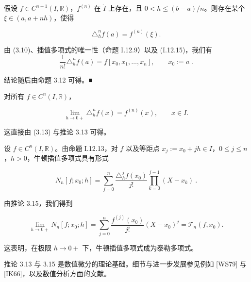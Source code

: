 \begin{proposition}

假设 $ f \in C^{n-1}(I, \mathbb{R}) $，$ f^{(n)} $ 在 $ \mathring{I} $ 上存在，且 $ 0 < h \leq (b - a)/n $。则存在某个 $ \xi \in (a, a + nh) $，使得

\begin{equation}
\triangle_{h}^{n}f(a)=f^{(n)}(\xi).
\end{equation}

\proofhead
由 (3.10)、插值多项式的唯一性（命题 I.12.9）以及 (I.12.15)，我们有
\begin{equation}
\frac{1}{n!}\triangle_{h}^{n}f(a)=f[x_{0},x_{1},\ldots,x_{n}],\qquad x_{0}:=a\;.
\end{equation}

结论随后由命题 3.12 可得。■

\end{proposition}

\begin{corollary}

对所有 $ f \in C^n(I, \mathbb{R}) $，

\[
\lim_{h\to0+}\triangle_{h}^{n} f(x)=f^{(n)}(x),\qquad x\in I.
\]

\proofhead
这直接由 (3.13) 与推论 3.13 可得。
\end{corollary}

\begin{remark}

\begin{items}
\item

设 $ f \in C^n(I, \mathbb{R}) $。由命题 I.12.13，对 $ f $ 以及等距点 $ x_j := x_0 + jh \in I $，$ 0 \leq j \leq n $，$ h > 0 $，牛顿插值多项式具有形式

\[
N_{n}[f;x_{0};h]=\sum_{j=0}^{n}\frac{\triangle_{h}^{j}f(x_{0})}{j!}\prod_{k=0}^{j-1}(X-x_{k})~.
\]

由推论 3.15，我们得到

\[
\lim_{h\to0+}N_{n}[f;x_{0};h]=\sum_{j=0}^{n}\frac{f^{(j)}(x_{0})}{j!}(X-x_{0})^{j}=\mathcal{T}_{n}(f,x_{0}).
\]

这表明，在极限 $ h \to 0+ $ 下，牛顿插值多项式成为泰勒多项式。

\item

推论 3.13 与 3.15 是数值微分的理论基础。细节与进一步发展参见例如 [WS79] 与 [IK66]，以及数值分析方面的文献。

\end{items}

\end{remark}

